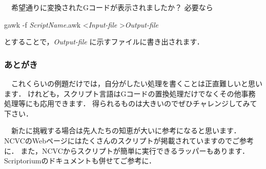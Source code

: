 \vspace*{1zh}
　希望通りに変換されたGコードが表示されましたか？
必要なら

\vspace*{1zh}
\begin{shadebox}
gawk -f \textit{ScriptName}.awk \textless \textit{Input-file} \textgreater \textit{Output-file}
\end{shadebox}

\vspace*{1zh}
とすることで，\textit{Output-file} に示すファイルに書き出されます．

\subsubsection{あとがき}
　これくらいの例題だけでは，自分がしたい処理を書くことは正直難しいと思います．
けれども，スクリプト言語はGコードの置換処理だけでなくその他事務処理等にも応用できます．
得られるものは大きいのでぜひチャレンジしてみて下さい．

　新たに挑戦する場合は先人たちの知恵が大いに参考になると思います．
NCVCのWebページにはたくさんのスクリプトが掲載されていますのでご参考に．
また，NCVCからスクリプトが簡単に実行できるラッパーもあります．Scriptoriumのドキュメントも併せてご参考に．